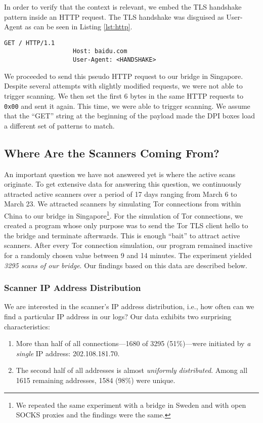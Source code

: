 \documentclass[runningheads,a4paper]{llncs}
\begin{document}
In order to verify that the context is relevant, we embed the TLS handshake pattern inside an HTTP
request. The TLS handshake was disguised as User-Agent as can be seen in Listing \ref{lst:http}.

\begin{lstlisting}[basicstyle=\footnotesize\ttfamily,caption={Crafted HTTP
request.},label={lst:http},captionpos=b]
                   GET / HTTP/1.1
                   Host: baidu.com
                   User-Agent: <HANDSHAKE>
\end{lstlisting}

We proceeded to send this pseudo HTTP request to our bridge in Singapore. Despite several attempts
with slightly modified requests, we were not able to trigger scanning. We then set the first 6 bytes
in the same HTTP requests to \texttt{0x00} and sent it again. This time, we were able to trigger
scanning. We assume that the ``GET'' string at the beginning of the payload made the DPI boxes load
a different set of patterns to match.

\subsection{Where Are the Scanners Coming From?}
An important question we have not answered yet is where the active scans originate. To get extensive
data for answering this question, we continuously attracted active scanners over a period of 17 days
ranging from March 6 to March 23. We attracted scanners by simulating Tor connections from within
China to our bridge in Singapore\footnote{We repeated the same experiment with a bridge in Sweden
and with open SOCKS proxies and the findings were the same.}. For the simulation of Tor connections,
we created a program whose only purpose was to send the Tor TLS client hello to the bridge and
terminate afterwards. This is enough ``bait'' to attract active scanners. After every Tor connection
simulation, our program remained inactive for a randomly chosen value between 9 and 14 minutes. The
experiment yielded \emph{3295 scans of our bridge}. Our findings based on this data are described below.

\subsubsection{Scanner IP Address Distribution}
We are interested in the scanner's IP address distribution, i.e., how often can we find a particular
IP address in our logs? Our data exhibits two surprising characteristics:
\begin{enumerate}
	\item More than half of all connections---1680 of 3295 (51\%)---were initiated by \emph{a
	single} IP address: 202.108.181.70.
	\item The second half of all addresses is almost \emph{uniformly distributed}. Among all 1615
	remaining addresses, 1584 (98\%) were unique.
\end{enumerate}
\end{document}
